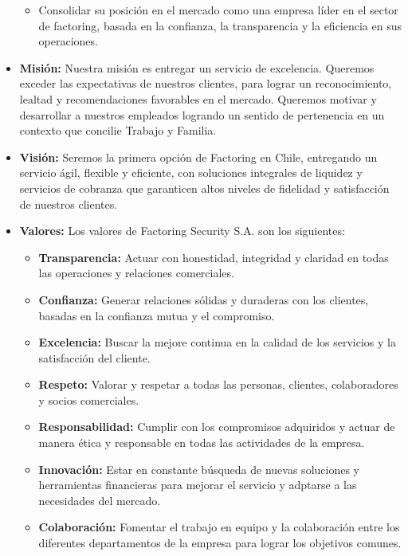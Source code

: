 \documentclass[12pt,a4paper]{report}
\begin{document}
\begin{itemize}
\begin{itemize}
        \item Consolidar su posición en el mercado como una empresa líder en el sector de factoring, basada en la confianza, la transparencia y la eficiencia en sus operaciones.
    \end{itemize}
    \item \textbf{Misión:} Nuestra misión es entregar un servicio de excelencia. Queremos exceder las expectativas de nuestros clientes, para lograr un reconocimiento, lealtad y recomendaciones favorables en el mercado. Queremos motivar y desarrollar a nuestros empleados logrando un sentido de pertenencia en un contexto que concilie Trabajo y Familia.
    \item \textbf{Visión:} Seremos la primera opción de Factoring en Chile, entregando un servicio ágil, flexible y eficiente, con soluciones integrales de liquidez y servicios de cobranza que garanticen altos niveles de fidelidad y satisfacción de nuestros clientes.
    \item \textbf{Valores:} Los valores de Factoring Security S.A. son los siguientes:
    \begin{itemize}
      \item \textbf{Transparencia:} Actuar con honestidad, integridad y claridad en todas las operaciones y relaciones comerciales.
      \item \textbf{Confianza:} Generar relaciones sólidas y duraderas con los clientes, basadas en la confianza mutua y el compromiso.
      \item \textbf{Excelencia:} Buscar la mejore continua en la calidad de los servicios y la satisfacción del cliente.
      \item \textbf{Respeto:} Valorar y respetar a todas las personas, clientes, colaboradores y socios comerciales.
      \item \textbf{Responsabilidad:} Cumplir con los compromisos adquiridos y actuar de manera ética y responsable en todas las actividades de la empresa.
      \item \textbf{Innovación:} Estar en constante búsqueda de nuevas soluciones y herramientas financieras para mejorar el servicio y adptarse a las necesidades del mercado.
      \item \textbf{Colaboración:} Fomentar el trabajo en equipo y la colaboración entre los diferentes departamentos de la empresa para lograr los objetivos comunes.
    \end{itemize}

\end{itemize}
\end{document}
